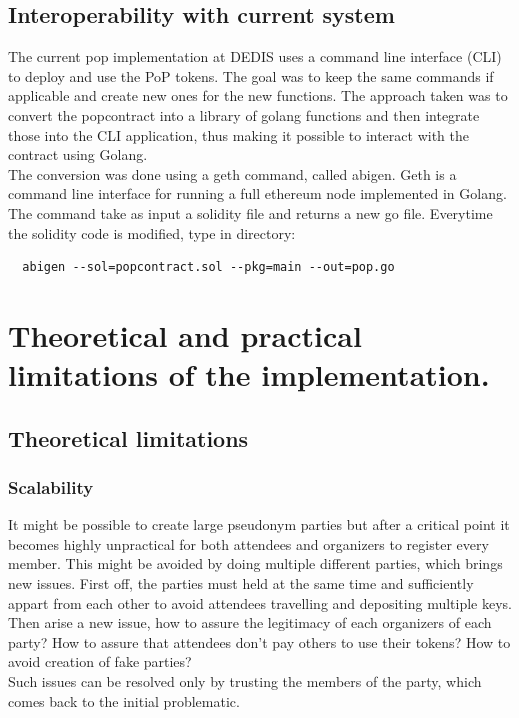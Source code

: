 \documentclass[11pt, a4paper, twoside, openright]{book} %
\begin{document}
\subsection{Interoperability with current system}
The current pop implementation at DEDIS uses a command line interface (CLI) to deploy and use the PoP tokens. The goal was to keep the same commands if applicable and create new ones for the new functions. The approach taken was to convert the popcontract into a library of golang functions and then integrate those into the CLI application, thus making it possible to interact with the contract using Golang.\\
The conversion was done using a geth command, called abigen. Geth is a command line interface for running a full ethereum node implemented in Golang. The command take as input a solidity file and returns a new go file. Everytime the solidity code is modified, type in directory:
\begin{verbatim}
  abigen --sol=popcontract.sol --pkg=main --out=pop.go
\end{verbatim}

\section{Theoretical and practical limitations of the implementation.}
\subsection{Theoretical limitations}
\subsubsection*{Scalability}
It might be possible to create large pseudonym parties but after a critical point it becomes highly unpractical for both attendees and organizers to register every member. This might be avoided by doing multiple different parties, which brings new issues. First off, the parties must held at the same time and sufficiently appart from each other to avoid attendees travelling and depositing multiple keys. Then arise a new issue, how to assure the legitimacy of each organizers of each party? How to assure that attendees don't pay others to use their tokens? How to avoid creation of fake parties? \\ Such issues can be resolved only by trusting the members of the party, which comes back to the initial problematic.
\end{document}
